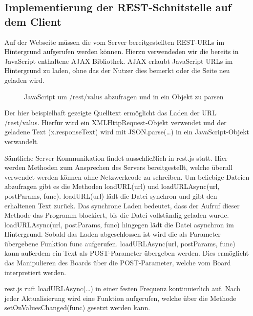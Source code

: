 

\subsection{Implementierung der REST-Schnitstelle auf dem Client}
Auf der Webseite müssen die vom Server bereitgestellten \ac{REST}-URLs im
Hintergrund aufgerufen werden können. Hierzu verwendeden wir die bereits in JavaScript
enthaltene \ac{AJAX} Bibliothek. \ac{AJAX} erlaubt JavaScript URLs im
Hintergrund zu laden, ohne das der Nutzer dies bemerkt oder die Seite neu geladen wird. 

\begin{figure}[H]

\caption{JavaScript um \textrm{/rest/valus} abzufragen und in ein Objekt zu
parsen}
\label{Ein typischer AJAX-Request}
\end{figure}

Der hier beispielhaft gezeigte Quelltext ermöglicht das Laden der \ac{URL}
\textrm{/rest/valus}.
Hierfür wird ein XMLHttpRequest-Objekt verwendet und der geladene Text
(\textrm{x.responseText}) wird mit \textrm{JSON.parse(\ldots)} in ein
JavaScript-Objekt verwandelt.

Sämtliche Server-Kommunikation findet ausschließlich in \textrm{rest.js} statt.
Hier werden Methoden zum Ansprechen des Servers bereitgestellt, welche überall
verwendet werden können ohne Netzwerkcode zu schreiben. Um beliebige Dateien
abzufragen gibt es die Methoden \textrm{loadURL(url)} und
\textrm{loadURLAsync(url, postParams, func)}. \textrm{loadURL(url)} lädt die
Datei synchron und gibt den erhaltenen Text zurück. Das synchrone Laden
bedeutet, dass der Aufruf dieser Methode das Programm blockiert, bis die Datei
vollständig geladen wurde. \textrm{loadURLAsync(url, postParams, func)} hingegen
lädt die Datei asynchron im Hintergrund. Sobald das Laden abgeschlossen ist wird
die als Parameter übergebene Funktion \textrm{func} aufgerufen.
\textrm{loadURLAsync(url, postParams, func)} kann außerdem ein Text als
POST-Parameter übergeben werden. Dies ermöglicht das Manipulieren des Boards
über die POST-Parameter, welche vom Board interpretiert werden.

\textrm{rest.js} ruft \textrm{loadURLAsync(\ldots)} in einer festen Frequenz
kontinuierlich auf. Nach jeder Aktualisierung wird eine Funktion aufgerufen,
welche über die Methode \textrm{setOnValuesChanged(func)} gesetzt werden kann.

